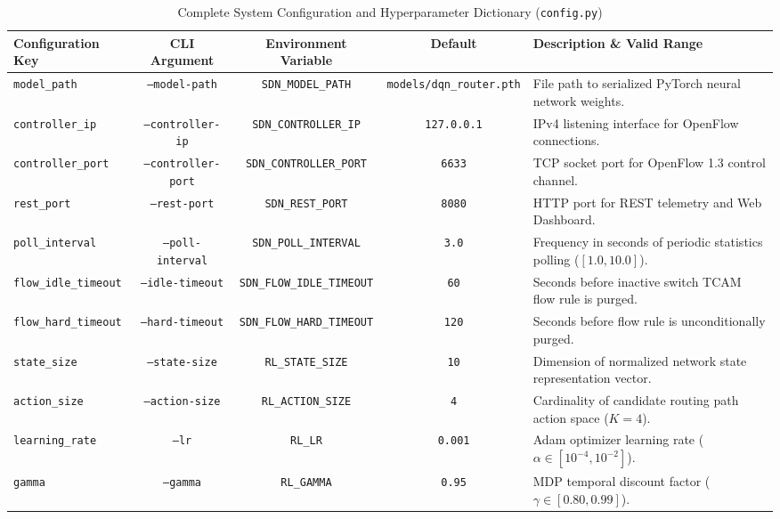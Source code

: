 \begin{table}[htbp]
\centering
\caption{Complete System Configuration and Hyperparameter Dictionary (\texttt{config.py})}
\label{tab:full_config_dictionary}
\scriptsize
\begin{tabularx}{\textwidth}{l c c c X}
\toprule
\textbf{Configuration Key} & \textbf{CLI Argument} & \textbf{Environment Variable} & \textbf{Default} & \textbf{Description \& Valid Range} \\
\midrule
\texttt{model\_path} & \texttt{--model-path} & \texttt{SDN\_MODEL\_PATH} & \texttt{models/dqn\_router.pth} & File path to serialized PyTorch neural network weights. \\
\texttt{controller\_ip} & \texttt{--controller-ip} & \texttt{SDN\_CONTROLLER\_IP} & \texttt{127.0.0.1} & IPv4 listening interface for OpenFlow connections. \\
\texttt{controller\_port} & \texttt{--controller-port} & \texttt{SDN\_CONTROLLER\_PORT} & \texttt{6633} & TCP socket port for OpenFlow 1.3 control channel. \\
\texttt{rest\_port} & \texttt{--rest-port} & \texttt{SDN\_REST\_PORT} & \texttt{8080} & HTTP port for REST telemetry and Web Dashboard. \\
\texttt{poll\_interval} & \texttt{--poll-interval} & \texttt{SDN\_POLL\_INTERVAL} & \texttt{3.0} & Frequency in seconds of periodic statistics polling ($[1.0, 10.0]$). \\
\texttt{flow\_idle\_timeout} & \texttt{--idle-timeout} & \texttt{SDN\_FLOW\_IDLE\_TIMEOUT} & \texttt{60} & Seconds before inactive switch TCAM flow rule is purged. \\
\texttt{flow\_hard\_timeout} & \texttt{--hard-timeout} & \texttt{SDN\_FLOW\_HARD\_TIMEOUT} & \texttt{120} & Seconds before flow rule is unconditionally purged. \\
\addlinespace
\texttt{state\_size} & \texttt{--state-size} & \texttt{RL\_STATE\_SIZE} & \texttt{10} & Dimension of normalized network state representation vector. \\
\texttt{action\_size} & \texttt{--action-size} & \texttt{RL\_ACTION\_SIZE} & \texttt{4} & Cardinality of candidate routing path action space ($K=4$). \\
\texttt{learning\_rate} & \texttt{--lr} & \texttt{RL\_LR} & \texttt{0.001} & Adam optimizer learning rate ($\alpha \in [10^{-4}, 10^{-2}]$). \\
\texttt{gamma} & \texttt{--gamma} & \texttt{RL\_GAMMA} & \texttt{0.95} & MDP temporal discount factor ($\gamma \in [0.80, 0.99]$). \\

\end{tabularx}
\end{table}
